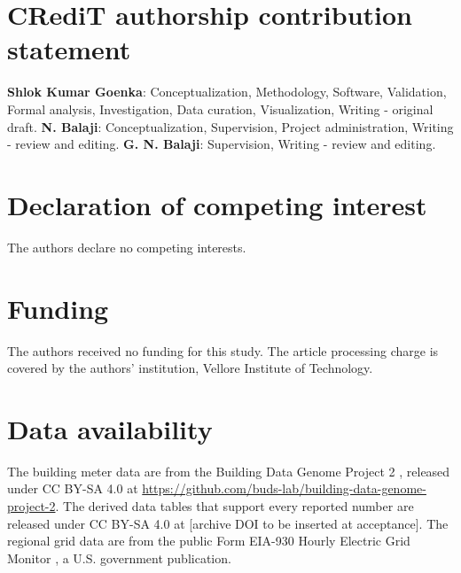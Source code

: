 
\section*{CRediT authorship contribution statement}

\textbf{Shlok Kumar Goenka}: Conceptualization, Methodology, Software, Validation, Formal analysis, Investigation, Data curation, Visualization, Writing - original draft. \textbf{N. Balaji}: Conceptualization, Supervision, Project administration, Writing - review and editing. \textbf{G. N. Balaji}: Supervision, Writing - review and editing.

\section*{Declaration of competing interest}

The authors declare no competing interests.

\section*{Funding}

The authors received no funding for this study. The article processing charge is covered by the authors' institution, Vellore Institute of Technology.

\section*{Data availability}

The building meter data are from the Building Data Genome Project 2 \cite{miller2020bdg2,bdg2repo}, released under CC BY-SA 4.0 at \url{https://github.com/buds-lab/building-data-genome-project-2}. The derived data tables that support every reported number are released under CC BY-SA 4.0 at [archive DOI to be inserted at acceptance]. The regional grid data are from the public Form EIA-930 Hourly Electric Grid Monitor \cite{eia930}, a U.S. government publication.


